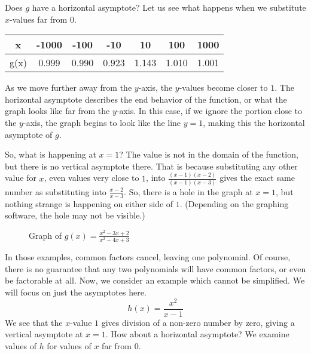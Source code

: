 Does \( g \) have a horizontal asymptote? Let us see what happens when we substitute \( x \)-values far from \( 0 \).

\begin{center}
\begin{tabular}{ |c|c|c|c|c|c|c| } 
 \hline
 x & -1000 & -100 & -10 & 10 & 100 & 1000 \\ 
 \hline
 g(x) & 0.999 & 0.990 & 0.923 & 1.143 & 1.010 & 1.001 \\ 
 \hline
\end{tabular}
\end{center}

As we move further away from the \( y \)-axis, the \( y \)-values become closer to \( 1 \). The horizontal asymptote describes the end behavior of the function, or what the graph looks like far from the \( y \)-axis. In this case, if we ignore the portion close to the \( y \)-axis, the graph begins to look like the line \( y = 1 \), making this the horizontal asymptote of \( g \). 

So, what is happening at \( x = 1 \)? The value is not in the domain of the function, but there is no vertical asymptote there. That is because substituting any other value for \( x \), even values very close to \( 1 \), into \( \frac{(x - 1)(x - 2)}{(x - 1)(x - 3)} \) gives the exact same number as substituting into \( \frac{x-2}{x-3} \). So, there is a hole in the graph at \( x = 1 \), but nothing strange is happening on either side of \( 1 \). (Depending on the graphing software, the hole may not be visible.)

\begin{figure}[htbp]
  \centering
  \caption{Graph of \( g(x) = \frac{x^2 - 3x + 2}{x^2 - 4x + 3} \)}
\end{figure}

In those examples, common factors cancel, leaving one polynomial. Of course, there is no guarantee that any two polynomials will have common factors, or even be factorable at all. Now, we consider an example which cannot be simplified. We will focus on just the asymptotes here.
\[ h(x) = \frac{x^2}{x - 1} \]
We see that the \( x \)-value \( 1 \) gives division of a non-zero number by zero, giving a vertical asymptote at \( x = 1 \). How about a horizontal asymptote? We examine values of \( h \) for values of \( x \) far from \( 0 \).

